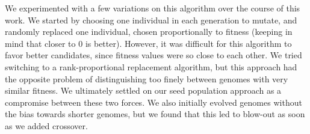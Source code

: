 We experimented with a few variations on this algorithm over the course of this
work.
We started by choosing one individual in each generation to mutate, and randomly
replaced one individual, chosen proportionally to fitness (keeping in mind that
closer to $0$ is better).
However, it was difficult for this algorithm to favor better candidates, since
fitness values were so close to each other.
We tried switching to a rank-proportional replacement algorithm, but this
approach had the opposite problem of distinguishing too finely between genomes
with very similar fitness.
We ultimately settled on our seed population approach as a compromise between
these two forces.
We also initially evolved genomes without the bias towards shorter genomes,
but we found that this led to blow-out as soon as we added crossover.

